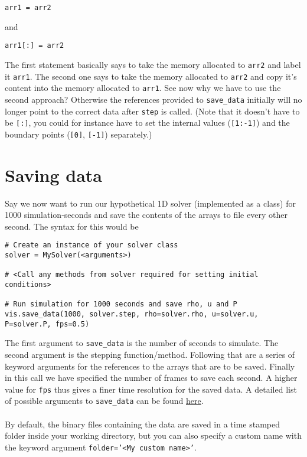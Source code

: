 \documentclass{article}
\newcommand{\ttt}[1]{\texttt{#1}}
\begin{document}
\begin{lstlisting}
arr1 = arr2
\end{lstlisting}
and
\begin{lstlisting}
arr1[:] = arr2
\end{lstlisting}
The first statement basically says to take the memory allocated to \ttt{arr2} and label it \ttt{arr1}. The second one says to take the memory allocated to \ttt{arr2} and copy it's content into the memory allocated to \ttt{arr1}. See now why we have to use the second approach? Otherwise the references provided to \ttt{save\_data} initially will no longer point to the correct data after \ttt{step} is called. (Note that it doesn't have to be \ttt{[:]}, you could for instance have to set the internal values (\ttt{[1:-1]}) and the boundary points (\ttt{[0]}, \ttt{[-1]}) separately.)

\section{Saving data}
\label{sec:save}
Say we now want to run our hypothetical 1D solver (implemented as a class) for 1000 simulation-seconds and save the contents of the arrays to file every other second. The syntax for this would be\\
\begin{minipage}{\linewidth}
\begin{lstlisting}
# Create an instance of your solver class
solver = MySolver(<arguments>)

# <Call any methods from solver required for setting initial conditions>

# Run simulation for 1000 seconds and save rho, u and P
vis.save_data(1000, solver.step, rho=solver.rho, u=solver.u, P=solver.P, fps=0.5)
\end{lstlisting}
\end{minipage}
The first argument to \ttt{save\_data} is the number of seconds to simulate. The second argument is the stepping function/method. Following that are a series of keyword arguments for the references to the arrays that are to be saved. Finally in this call we have specified the number of frames to save each second. A higher value for \ttt{fps} thus gives a finer time resolution for the saved data. A detailed list of possible arguments to \ttt{save\_data} can be found \hyperref[sec:sd]{here}.\\\\By default, the binary files containing the data are saved in a time stamped folder inside your working directory, but you can also specify a custom name with the keyword argument \ttt{folder='<My custom name>'}.
\end{document}

